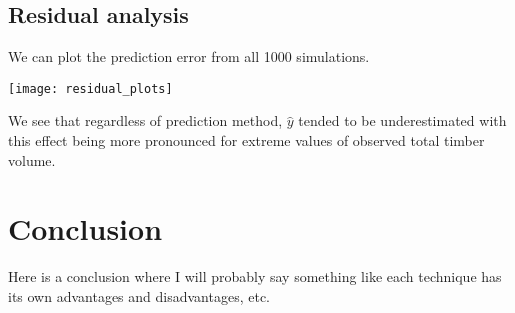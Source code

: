\documentclass{article}
\begin{document}
\subsection{Residual analysis}

We can plot the prediction error from all 1000 simulations.

\begin{center}
\texttt{[image: residual\_plots]}
\end{center}

We see that regardless of prediction method, $\hat{y}$ tended to be underestimated with this effect being more pronounced for extreme values of observed total timber volume.

\section{Conclusion}
Here is a conclusion where I will probably say something like each technique has its own advantages and disadvantages, etc.

\printbibliography
\end{document}
